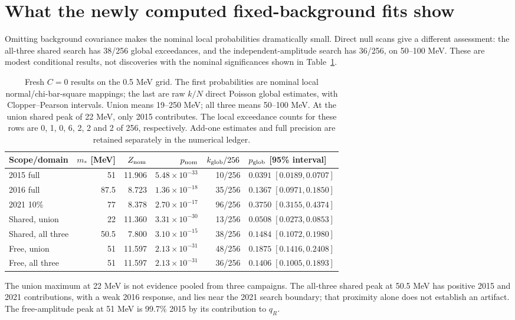 \section*{What the newly computed fixed-background fits show}
Omitting background covariance makes the nominal local probabilities dramatically
small. Direct null scans give a different assessment: the all-three shared
search has 38/256 global exceedances, and the independent-amplitude search has
36/256, on 50--100 MeV. These are modest conditional results, not discoveries
with the nominal significances shown in Table~\ref{tab:c0-peaks}.

\begin{table}[htbp]\centering\small
\setlength{\tabcolsep}{4pt}
\begin{tabular}{lrrrrl}\toprule
Scope/domain & $m_*$ [MeV] & $Z_{\rm nom}$ & $p_{\rm nom}$ & $k_{\rm glob}/256$ & $p_{\rm glob}$ [95\% interval]\\\midrule
2015 full & 51 & 11.906 & $5.48\times10^{-33}$ & 10/256 & $0.0391\;[0.0189,0.0707]$\\
2016 full & 87.5 & 8.723 & $1.36\times10^{-18}$ & 35/256 & $0.1367\;[0.0971,0.1850]$\\
2021 10\% & 77 & 8.378 & $2.70\times10^{-17}$ & 96/256 & $0.3750\;[0.3155,0.4374]$\\
Shared, union & 22 & 11.360 & $3.31\times10^{-30}$ & 13/256 & $0.0508\;[0.0273,0.0853]$\\
Shared, all three & 50.5 & 7.800 & $3.10\times10^{-15}$ & 38/256 & $0.1484\;[0.1072,0.1980]$\\
Free, union & 51 & 11.597 & $2.13\times10^{-31}$ & 48/256 & $0.1875\;[0.1416,0.2408]$\\
Free, all three & 51 & 11.597 & $2.13\times10^{-31}$ & 36/256 & $0.1406\;[0.1005,0.1893]$\\
\bottomrule\end{tabular}
\caption{Fresh $C=0$ results on the 0.5 MeV grid. The first probabilities are
nominal local normal/chi-bar-square mappings; the last are raw $k/N$ direct
Poisson global estimates, with Clopper--Pearson intervals. Union means
19--250 MeV; all three means 50--100 MeV. At the union shared peak of 22 MeV,
only 2015 contributes. The local exceedance counts for these rows are
0, 1, 0, 6, 2, 2 and 2 of 256, respectively. Add-one estimates and full
precision are retained separately in the numerical ledger.}
\label{tab:c0-peaks}
\end{table}

The union maximum at 22 MeV is not evidence pooled from three campaigns.
The all-three shared peak at 50.5 MeV has positive 2015 and 2021 contributions,
with a weak 2016 response, and lies near the 2021 search boundary; that proximity
alone does not establish an artifact. The free-amplitude peak at 51 MeV is
99.7\% 2015 by its contribution to $q_R$.


